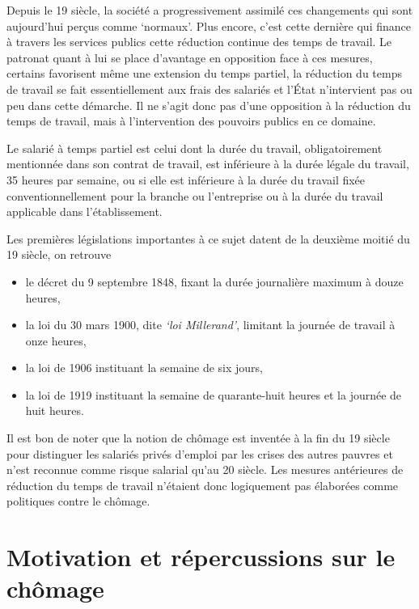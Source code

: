 \documentclass[main.tex]{subfiles}
\begin{document}
Depuis le 19 siècle, la société a progressivement assimilé ces changements qui sont aujourd'hui perçus comme `normaux'. Plus encore, c'est cette dernière qui finance à travers les services publics cette réduction continue des temps de travail.
Le patronat quant à lui se place d'avantage en opposition face à ces mesures, certains favorisent même une extension du temps partiel, la réduction du temps de travail se fait essentiellement aux frais des salariés et l'État n'intervient pas ou peu dans cette démarche. Il ne s'agit donc pas d'une opposition à la réduction du temps de travail, mais à l'intervention des pouvoirs publics en ce domaine.

\begin{definition}
        Le salarié à temps partiel est celui dont la durée du travail, obligatoirement mentionnée dans son contrat de travail, est inférieure à la durée légale du travail, 35 heures par semaine, ou si elle est inférieure à la durée du travail fixée conventionnellement pour la branche ou l'entreprise ou à la durée du travail applicable dans l'établissement.
\end{definition}

Les premières législations importantes à ce sujet datent de la deuxième moitié du 19 siècle, on retrouve
\begin{itemize}
        \item le décret du 9 septembre 1848, fixant la durée journalière maximum à douze heures,
        \item la loi du 30 mars 1900, dite \emph{`loi Millerand'}, limitant la journée de travail à onze heures,
        \item la loi de 1906 instituant la semaine de six jours,
        \item la loi de 1919 instituant la semaine de quarante-huit heures et la journée de huit heures.
\end{itemize}

Il est bon de noter que la notion de chômage est inventée à la fin du 19 siècle pour distinguer les salariés privés d'emploi par les crises des autres pauvres et n'est reconnue comme risque salarial qu'au 20 siècle. Les mesures antérieures de réduction du temps de travail n'étaient donc logiquement pas élaborées comme politiques contre le chômage.

        \section{Motivation et répercussions sur le chômage}
\end{document}

